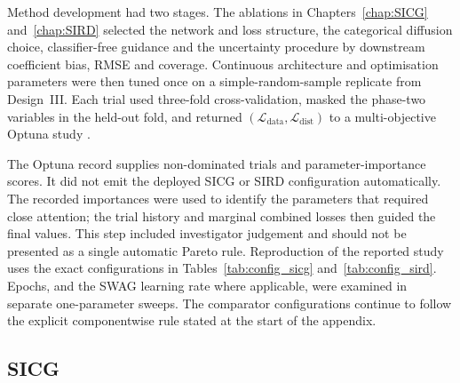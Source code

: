 Method development had two stages. The ablations in Chapters~\ref{chap:SICG} and~\ref{chap:SIRD} selected the network and loss structure, the categorical diffusion choice, classifier-free guidance and the uncertainty procedure by downstream coefficient bias, RMSE and coverage. Continuous architecture and optimisation parameters were then tuned once on a simple-random-sample replicate from Design~III. Each trial used three-fold cross-validation, masked the phase-two variables in the held-out fold, and returned $(\mathcal L_{\mathrm{data}},\mathcal L_{\mathrm{dist}})$ to a multi-objective Optuna study \citep{Akiba2019}.

The Optuna record supplies non-dominated trials and parameter-importance scores. It did not emit the deployed SICG or SIRD configuration automatically. The recorded importances were used to identify the parameters that required close attention; the trial history and marginal combined losses then guided the final values. This step included investigator judgement and should not be presented as a single automatic Pareto rule. Reproduction of the reported study uses the exact configurations in Tables~\ref{tab:config_sicg} and~\ref{tab:config_sird}. Epochs, and the SWAG learning rate where applicable, were examined in separate one-parameter sweeps. The comparator configurations continue to follow the explicit componentwise rule stated at the start of the appendix.

\subsection{SICG}

